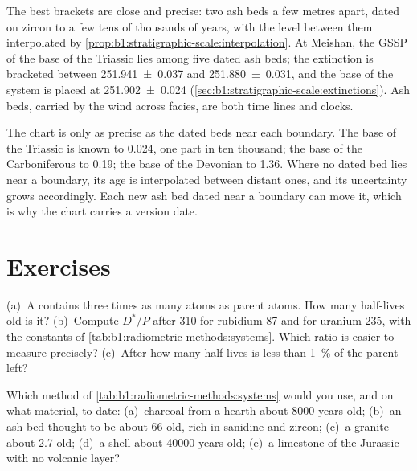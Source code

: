 The best brackets are close and precise: two ash beds a few metres apart, dated
on zircon to a few tens of thousands of years, with the level between them
interpolated by \cref{prop:b1:stratigraphic-scale:interpolation}. At Meishan,
the GSSP of the base of the Triassic lies among five dated ash beds; the
extinction is bracketed between \qty[uncertainty-mode=separate]{251.941(37)}{\Ma}
and \qty[uncertainty-mode=separate]{251.880(31)}{\Ma}, and the base of the system
is placed at \qty[uncertainty-mode=separate]{251.902(24)}{\Ma}
(\cref{sec:b1:stratigraphic-scale:extinctions}). Ash beds, carried by the wind
across facies, are both time lines and clocks.

The chart is only as precise as the dated beds near each boundary. The base of
the Triassic is known to \qty{0.024}{\Myr}, one part in ten thousand; the base of
the Carboniferous to \qty{0.19}{\Myr}; the base of the Devonian to
\qty{1.36}{\Myr}. Where no dated bed lies near a boundary, its age is
interpolated between distant ones, and its uncertainty grows accordingly. Each
new ash bed dated near a boundary can move it, which is why the chart carries a
version date.

\section{Exercises}

\begin{exercise}[$\star$]\label{exo:b1:radiometric-methods:1}
(a)~A  contains three times as many  atoms as parent
atoms. How many half-lives old is it? (b)~Compute $D^*/P$ after
\qty{310}{\Myr} for rubidium-87 and for uranium-235, with the constants of
\cref{tab:b1:radiometric-methods:systems}. Which ratio is easier to measure
precisely? (c)~After how many half-lives is less than \qty{1}{\percent} of the
parent left?
\end{exercise}

\begin{exercise}[$\star$]\label{exo:b1:radiometric-methods:2}
Which method of \cref{tab:b1:radiometric-methods:systems} would you use, and on
what material, to date: (a)~charcoal from a hearth about \num{8000} years old;
(b)~an ash bed thought to be about \qty{66}{\Ma} old, rich in sanidine and
zircon; (c)~a granite about \qty{2.7}{\Ga} old; (d)~a shell about
\num{40000} years old; (e)~a limestone of the Jurassic with no volcanic layer?
\end{exercise}

